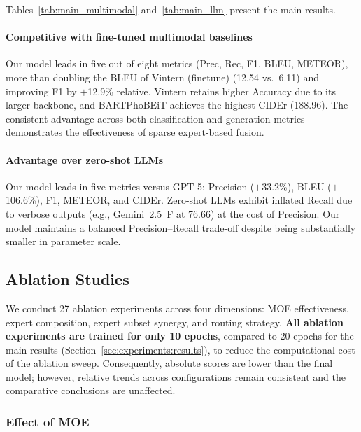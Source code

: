 Tables~\ref{tab:main_multimodal} and~\ref{tab:main_llm} present the main results.

\paragraph{Competitive with fine-tuned multimodal baselines}
Our model leads in five out of eight metrics (Prec, Rec, F1, BLEU, METEOR), more than doubling the BLEU of Vintern (finetune) (12.54 vs.\ 6.11) and improving F1 by $+$12.9\% relative. Vintern retains higher Accuracy due to its larger backbone, and BARTPhoBEiT achieves the highest CIDEr (188.96). The consistent advantage across both classification and generation metrics demonstrates the effectiveness of sparse expert-based fusion.

\paragraph{Advantage over zero-shot LLMs}
Our model leads in five metrics versus GPT-5: Precision ($+$33.2\%), BLEU ($+$106.6\%), F1, METEOR, and CIDEr. Zero-shot LLMs exhibit inflated Recall due to verbose outputs (e.g., Gemini~2.5~F at 76.66) at the cost of Precision. Our model maintains a balanced Precision--Recall trade-off despite being substantially smaller in parameter scale.

\subsection{Ablation Studies}
\label{sec:experiments:ablation}

We conduct 27 ablation experiments across four dimensions: MOE effectiveness, expert composition, expert subset synergy, and routing strategy. \textbf{All ablation experiments are trained for only 10 epochs}, compared to 20 epochs for the main results (Section~\ref{sec:experiments:results}), to reduce the computational cost of the ablation sweep. Consequently, absolute scores are lower than the final model; however, relative trends across configurations remain consistent and the comparative conclusions are unaffected.

\subsubsection{Effect of MOE}
\label{sec:experiments:ablation:moe}

